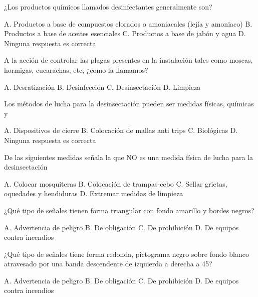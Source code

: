 \documentclass[answers,11pt]{exam}
\begin{document}
{\begin{questions}
  \question ¿Los productos químicos llamados desinfectantes generalmente son?
    \begin{checkboxes}
      \CorrectChoice A. Productos a base de compuestos clorados o amoniacales
      (lejía y amoniaco)
      \choice B. Productos a base de aceites esenciales
      \choice C. Productos a base de jabón y agua
      \choice D. Ninguna respuesta es correcta
    \end{checkboxes}

  \question A la acción de controlar las plagas presentes en la instalación
    tales como moscas, hormigas, cucarachas, etc, ¿como la llamamos?
    \begin{checkboxes}
      \choice A. Desratización
      \choice B. Desinfección
      \CorrectChoice C. Desinsectación
      \choice D. Limpieza
      \end{checkboxes}
  \question Los métodos de lucha para la desinsectación pueden ser medidas
    físicas, químicas y
    \begin{checkboxes}
      \choice A. Dispositivos de cierre
      \choice B. Colocación de mallas anti trips
      \CorrectChoice C. Biológicas
      \choice D. Ninguna respuesta es correcta
    \end{checkboxes}

  \question De las siguientes medidas señala la que NO es una medida física de
    lucha para la desinsectación
    \begin{checkboxes}
      \choice A. Colocar mosquiteras
      \CorrectChoice B. Colocación de trampas-cebo
      \choice C. Sellar grietas, oquedades y hendiduras
      \choice D. Extremar medidas de limpieza
    \end{checkboxes}
\newpage
  \question ¿Qué tipo de señales tienen forma triangular con fondo amarillo y
    bordes negros?
    \begin{checkboxes}
      \CorrectChoice A. Advertencia de peligro
      \choice B. De obligación
      \choice C. De prohibición
      \choice D. De equipos contra incendios
    \end{checkboxes}

  \question ¿Qué tipo de señales tiene forma redonda, pictograma negro sobre
    fondo blanco atravesado por una banda descendente de izquierda a derecha a
    45\textdegree{}?
    \begin{checkboxes}
      \choice A. Advertencia de peligro
      \choice B. De obligación
      \CorrectChoice C. De prohibición
      \choice D. De equipos contra incendios
    \end{checkboxes}


\end{questions}}
\end{document}
